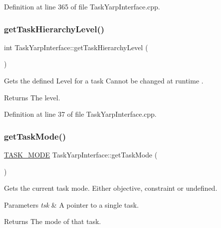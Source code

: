 Definition at line 365 of file Task\+Yarp\+Interface.\+cpp.

\hypertarget{classocra_1_1TaskYarpInterface_a2f15f22139495aa6c70b7b957cf1c27d}{}\label{classocra_1_1TaskYarpInterface_a2f15f22139495aa6c70b7b957cf1c27d} 
\subsubsection{\texorpdfstring{get\+Task\+Hierarchy\+Level()}{getTaskHierarchyLevel()}}
{\footnotesize\ttfamily int Task\+Yarp\+Interface\+::get\+Task\+Hierarchy\+Level (\begin{DoxyParamCaption}{ }\end{DoxyParamCaption})}

Gets the defined Level for a task  Cannot be changed at runtime .

\begin{DoxyReturn}{Returns}
The level. 
\end{DoxyReturn}


Definition at line 37 of file Task\+Yarp\+Interface.\+cpp.

\hypertarget{classocra_1_1TaskYarpInterface_a37db4979419a10881dd8f888330cfa28}{}\label{classocra_1_1TaskYarpInterface_a37db4979419a10881dd8f888330cfa28} 
\subsubsection{\texorpdfstring{get\+Task\+Mode()}{getTaskMode()}}
{\footnotesize\ttfamily \hyperlink{namespaceocra_a2ed783528071ed7ee7a57d923637595f}{T\+A\+S\+K\+\_\+\+M\+O\+DE} Task\+Yarp\+Interface\+::get\+Task\+Mode (\begin{DoxyParamCaption}{ }\end{DoxyParamCaption})}

Gets the current task mode. Either objective, constraint or undefined. 
\begin{DoxyParams}{Parameters}
{\em tsk} & A pointer to a single task.\\
\hline
\end{DoxyParams}
\begin{DoxyReturn}{Returns}
The mode of that task. 
\end{DoxyReturn}


